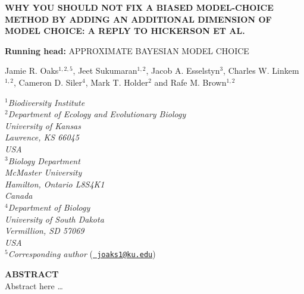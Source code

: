 \documentclass[letterpaper,12pt]{article}
\begin{document}
\doublespacing
\raggedright
\setlength{\parindent}{0.5in}
\begin{linenumbers}

\begin{titlepage}
    \begin{flushleft}
        \sffamily

        \MakeUppercase{\large\bfseries Why you should not fix a biased
        model-choice method by adding an additional dimension of model choice:
        A reply to Hickerson et al.}

        \vspace{12pt}
        \textbf{Running head:} \MakeUppercase{Approximate Bayesian model
        choice}

        \vspace{12pt}
        Jamie R. Oaks$^{1,2,5}$, Jeet Sukumaran$^{1,2}$, Jacob A.
        Esselstyn$^{3}$, Charles W. Linkem$^{1,2}$, Cameron D.
        Siler$^{4}$, Mark T. Holder$^{2}$ and Rafe M. Brown$^{1,2}$

        \bigskip
        $^1$\emph{Biodiversity Institute\\
            $^2$Department of Ecology and Evolutionary Biology\\ 
            University of Kansas\\
            Lawrence, KS 66045\\
            USA}\\[.1in]
        $^3$\emph{Biology Department\\
            McMaster University\\
            Hamilton, Ontario L8S4K1\\
            Canada}\\[.1in]
        $^4$\emph{Department of Biology\\
            University of South Dakota\\
            Vermillion, SD 57069\\
            USA}\\[.1in]
        $^5$\emph{Corresponding author} (\href{mailto:joaks1@ku.edu}{\tt
        joaks1@ku.edu})\\

    \end{flushleft}
\end{titlepage}

{\sffamily
    \noindent\textbf{ABSTRACT} \\
    \noindent Abstract here \ldots

}
\end{linenumbers}
\end{document}
